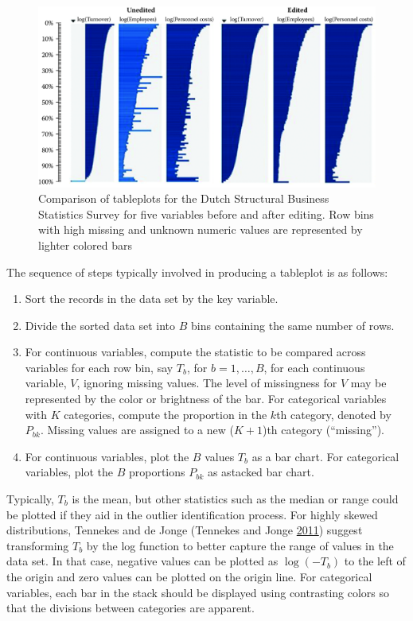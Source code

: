 \documentclass[]{krantz}
\begin{document}
\begin{figure}

{\centering \includegraphics[width=0.7\linewidth]{ChapterError/figures/fig10-7} 

}

\caption{Comparison of tableplots for the Dutch Structural Business Statistics Survey for five variables before and after editing. Row bins with high missing and unknown numeric values are represented by lighter colored bars}\label{fig:fig10-7}
\end{figure}

\vspace*{24pt} The sequence of steps typically involved in producing a
tableplot is as follows:

\begin{enumerate}
\def\labelenumi{\arabic{enumi}.}
\item
  Sort the records in the data set by the key variable.
\item
  Divide the sorted data set into \(B\) bins containing the same number
  of rows.
\item
  For continuous variables, compute the statistic to be compared across
  variables for each row bin, say \(T_{b}\), for \(b = 1,\ldots ,B\),
  for each continuous variable, \(V\), ignoring missing values. The
  level of missingness for \(V\) may be represented by the color or
  brightness of the bar. For categorical variables with \(K\)
  categories, compute the proportion in the \(k\)th category, denoted by
  \(P_{bk}\). Missing values are assigned to a new (\(K+1\))th category
  (``missing'').
\item
  For continuous variables, plot the \(B\) values \(T_{b}\) as a bar
  chart. For categorical variables, plot the \(B\) proportions
  \(P_{bk}\) as astacked bar chart.
\end{enumerate}

Typically, \(T_{b}\) is the mean, but other statistics such as the
median or range could be plotted if they aid in the outlier
identification process. For highly skewed distributions, Tennekes and de
Jonge (Tennekes and Jonge \protect\hyperlink{ref-tennekes2011top}{2011})
suggest transforming \(T_{b}\) by the log function to better capture the
range of values in the data set. In that case, negative values can be
plotted as \(\log(-T_{b})\) to the left of the origin and zero values
can be plotted on the origin line. For categorical variables, each bar
in the stack should be displayed using contrasting colors so that the
divisions between categories are apparent.
\end{document}
